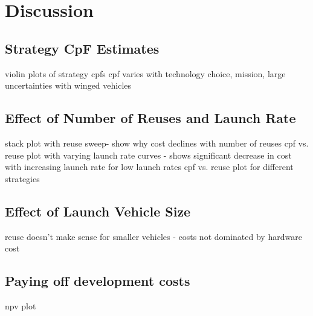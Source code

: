 \documentclass[conf]{new-aiaa}
\begin{document}
\section{Discussion}

\subsection{Strategy CpF Estimates}
violin plots of strategy cpfs
cpf varies with technology choice, mission, large uncertainties with winged vehicles

\subsection{Effect of Number of Reuses and Launch Rate}
stack plot with reuse sweep- show why cost declines with number of reuses
cpf vs. reuse plot with varying launch rate curves - shows significant decrease in cost with increasing launch rate for low launch rates
cpf vs. reuse plot for different strategies 

\subsection{Effect of Launch Vehicle Size}
reuse doesn't make sense for smaller vehicles - costs not dominated by hardware cost

\subsection{Paying off development costs}
npv plot


\end{document}
